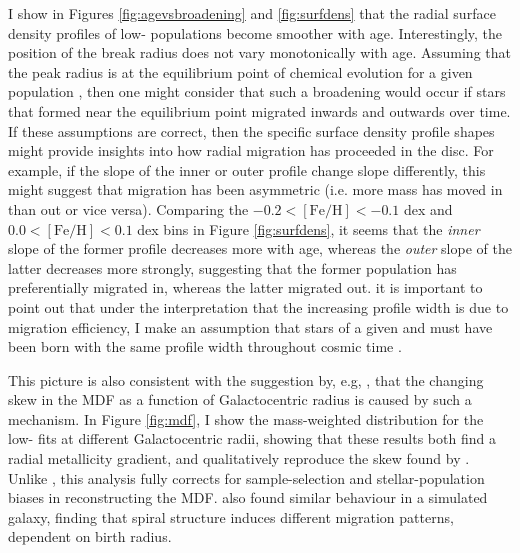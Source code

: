 I show in Figures \ref{fig:agevsbroadening} and \ref{fig:surfdens}  that the radial surface density profiles of low-\afe{} populations become smoother with age. Interestingly, the position of the break radius does not vary monotonically with age. Assuming that the peak radius is at the equilibrium point of chemical evolution for a given population  \citep[where the consumption of gas and its dilution are balanced, as discussed in][]{2016ApJ...823...30B}, then one might consider that such a broadening would occur if stars that formed near the equilibrium point migrated inwards and outwards over time.  If these assumptions are correct, then the specific surface density profile shapes might provide insights into how radial migration has proceeded in the disc. For example, if the slope of the inner or outer profile change slope differently, this might suggest that migration has been asymmetric (i.e. more mass has moved in than out or vice versa). Comparing the $-0.2 <\mathrm{[Fe/H]}<-0.1$ dex and $0.0 <\mathrm{[Fe/H]}<0.1$ dex bins in Figure \ref{fig:surfdens}, it seems that the \emph{inner} slope of the former profile decreases more with age, whereas the \emph{outer} slope of the latter decreases more strongly, suggesting that the former population has preferentially migrated in, whereas the latter migrated out.  it is important to point out that under the interpretation that the increasing profile width is due to migration efficiency, I make an assumption that stars of a given \feh{} and \afe{} must have been born with the same profile width throughout cosmic time \citep[as discussed by, e.g.][]{2017ApJ...834...27M}.


This picture is also consistent with the suggestion by, e.g, \citet[][]{2015ApJ...808..132H,2011ApJ...737....8L}, that the changing skew in the MDF as a function of Galactocentric radius is caused by such a mechanism. In Figure \ref{fig:mdf}, I show the mass-weighted \feh{} distribution for the low-\afe{} fits at different Galactocentric radii, showing that these results both find a radial metallicity gradient, and qualitatively reproduce the skew found by \citet[][]{2015ApJ...808..132H}. Unlike \citet[][]{2015ApJ...808..132H}, this analysis fully corrects for sample-selection and stellar-population biases in reconstructing the MDF. \citet{2016MNRAS.460L..94G} also found similar behaviour in a simulated galaxy, finding that spiral structure induces different migration patterns, dependent on birth radius. 

